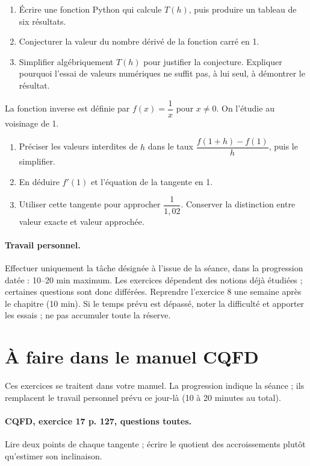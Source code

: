 \begin{enumerate}[label=\arabic*.]
\item Écrire une fonction Python qui calcule $T(h)$, puis produire un tableau de six résultats.
\item Conjecturer la valeur du nombre dérivé de la fonction carré en 1.
\item Simplifier algébriquement $T(h)$ pour justifier la conjecture. Expliquer pourquoi l’essai de valeurs numériques ne suffit pas, à lui seul, à démontrer le résultat.
\end{enumerate}
La fonction inverse est définie par $f(x)=\dfrac1x$ pour $x\ne0$. On l’étudie au voisinage de 1.
\begin{enumerate}[label=\arabic*.]
\item Préciser les valeurs interdites de $h$ dans le taux $\dfrac{f(1+h)-f(1)}h$, puis le simplifier.
\item En déduire $f\prime(1)$ et l’équation de la tangente en 1.
\item Utiliser cette tangente pour approcher $\dfrac1{1{,}02}$. Conserver la distinction entre valeur exacte et valeur approchée.
\end{enumerate}
\paragraph{Travail personnel.} Effectuer uniquement la tâche désignée à l’issue de la séance, dans la progression datée : 10–20 min maximum. Les exercices dépendent des notions déjà étudiées ; certaines questions sont donc différées. Reprendre l’exercice 8 une semaine après le chapitre (10 min). Si le temps prévu est dépassé, noter la difficulté et apporter les essais ; ne pas accumuler toute la réserve.
\endgroup
{}\section*{À faire dans le manuel CQFD}
Ces exercices se traitent dans votre manuel. La progression indique la séance ; ils remplacent le travail personnel prévu ce jour-là (10 à 20 minutes au total).
\paragraph{CQFD, exercice 17 p. 127, questions toutes.}\label{C04-M1} Lire deux points de chaque tangente ; écrire le quotient des accroissements plutôt qu’estimer son inclinaison.
